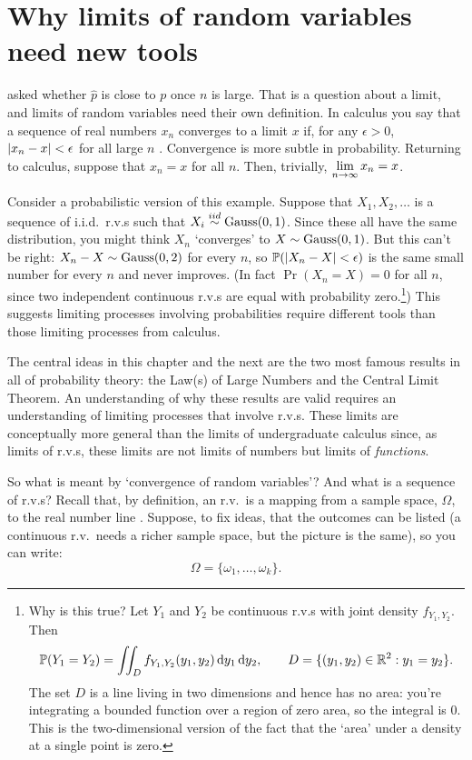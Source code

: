 \section{Why limits of random variables need new tools}
\label{sec:conv-why}

 asked whether $\hat{p}$ is close to $p$ once $n$ is large.
That is a question about a limit, and limits of random variables need their own definition.
In calculus you say that a sequence of real numbers $x_n$ converges to a limit $x$ if, for any $\epsilon > 0$, $\lvert x_n - x\rvert < \epsilon$ for all large $n$ .
Convergence is more subtle in probability.
Returning to calculus, suppose that $x_n = x$ for all $n$.
Then, trivially, $\displaystyle \lim_{n \to \infty} x_n = x$.

Consider a probabilistic version of this example.
Suppose that $X_1, X_2, \ldots$ is a sequence of i.i.d.\ r.v.s such that $X_i \stackrel{iid}{\sim} \text{Gauss}(0,1)$.
Since these all have the same distribution, you might think $X_n$ `converges' to $X \sim \text{Gauss}(0,1)$.
But this can't be right: $X_n - X \sim \text{Gauss}(0, 2)$ for every $n$, so $\mathbb{P}(\lvert X_n - X\rvert < \epsilon)$ is the same small number for every $n$ and never improves. (In fact $\Pr(X_n = X) = 0$ for all $n$, since two independent continuous r.v.s are equal with probability zero.\footnote{Why is this true? Let $Y_1$ and $Y_2$ be continuous r.v.s with joint density $f_{Y_1, Y_2}$. Then
\[
\mathbb{P}(Y_1 = Y_2) = \iint_D f_{Y_1, Y_2}(y_1, y_2) \, \mathrm{d}y_1 \, \mathrm{d}y_2, \qquad D = \{(y_1,y_2) \in \mathbb{R}^2: y_1 = y_2 \}.
\]
The set $D$ is a line living in two dimensions and hence has no area: you're integrating a bounded function over a region of zero area, so the integral is $0$.
This is the two-dimensional version of the fact that the `area' under a density at a single point is zero.})
This suggests limiting processes involving probabilities require different tools than those limiting processes from calculus.

The central ideas in this chapter and the next are the two most famous results in all of probability theory: the Law(s) of Large Numbers and the Central Limit Theorem.
An understanding of why these results are valid requires an understanding of limiting processes that involve r.v.s.
These limits are conceptually more general than the limits of undergraduate calculus since, as limits of r.v.s, these limits are not limits of numbers but limits of \textit{functions}.

So what is meant by `convergence of random variables'?
And what is a sequence of r.v.s?
Recall that, by definition, an r.v.\ is a mapping from a sample space, $\Omega$, to the real number line .
Suppose, to fix ideas, that the outcomes can be listed (a continuous r.v.\ needs a richer sample space, but the picture is the same), so you can write:
\[
\Omega = \{ \omega_1, \ldots, \omega_k \}.
\]

